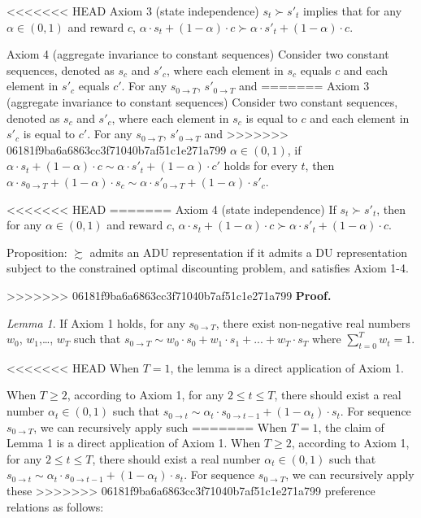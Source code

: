 \documentclass[
  12pt,
]{article}
\begin{document}
<<<<<<< HEAD
Axiom 3 (state independence) \(s_t \succ s'_t\) implies that for any
\(\alpha \in (0,1)\) and reward \(c\),
\(\alpha \cdot s_t + (1-\alpha)\cdot c \succ \alpha \cdot s'_t + (1-\alpha)\cdot c\).

Axiom 4 (aggregate invariance to constant sequences) Consider two
constant sequences, denoted as \(s_c\) and \(s'_c\), where each element
in \(s_c\) equals \(c\) and each element in \(s'_c\) equals \(c'\). For
any \(s_{0\rightarrow T}\), \(s'_{0\rightarrow T}\) and
=======
Axiom 3 (aggregate invariance to constant sequences) Consider two
constant sequences, denoted as \(s_c\) and \(s'_c\), where each element
in \(s_c\) is equal to \(c\) and each element in \(s'_c\) is equal to
\(c'\). For any \(s_{0\rightarrow T}\), \(s'_{0\rightarrow T}\) and
>>>>>>> 06181f9ba6a6863cc3f71040b7af51c1e271a799
\(\alpha\in(0,1)\), if
\(\alpha \cdot s_t+(1-\alpha)\cdot c\sim\alpha \cdot s'_t+(1-\alpha)\cdot c'\)
holds for every \(t\), then
\(\alpha \cdot s_{0\rightarrow T}+(1-\alpha)\cdot s_c\sim \alpha \cdot s'_{0\rightarrow T}+(1-\alpha)\cdot s'_c\).

<<<<<<< HEAD
=======
Axiom 4 (state independence) If \(s_t \succ s'_t\), then for any
\(\alpha \in (0,1)\) and reward \(c\),
\(\alpha \cdot s_t + (1-\alpha)\cdot c \succ \alpha \cdot s'_t + (1-\alpha)\cdot c\).

Proposition: \(\succsim\) admits an ADU representation if it admits a DU
representation subject to the constrained optimal discounting problem,
and satisfies Axiom 1-4.

>>>>>>> 06181f9ba6a6863cc3f71040b7af51c1e271a799
\textbf{Proof.}

\emph{Lemma 1}. If Axiom 1 holds, for any \(s_{0\rightarrow T}\), there
exist non-negative real numbers \(w_0\), \(w_1\),\ldots, \(w_T\) such
that
\(s_{0\rightarrow T} \sim w_0 \cdot s_0 +w_1\cdot s_1 + ...+w_T\cdot s_T\)
where \(\sum_{t=0}^T w_t=1\).

<<<<<<< HEAD
When \(T=1\), the lemma is a direct application of Axiom 1.

When \(T\geq 2\), according to Axiom 1, for any \(2\leq t\leq T\), there
should exist a real number \(\alpha_t\in(0,1)\) such that
\(s_{0\rightarrow t}\sim \alpha_t\cdot s_{0\rightarrow t-1}+(1-\alpha_t)\cdot s_{t}\).
For sequence \(s_{0\rightarrow T}\), we can recursively apply such
=======
When \(T=1\), the claim of Lemma 1 is a direct application of Axiom 1.
When \(T\geq 2\), according to Axiom 1, for any \(2\leq t\leq T\), there
should exist a real number \(\alpha_t\in(0,1)\) such that
\(s_{0\rightarrow t}\sim \alpha_t\cdot s_{0\rightarrow t-1}+(1-\alpha_t)\cdot s_{t}\).
For sequence \(s_{0\rightarrow T}\), we can recursively apply these
>>>>>>> 06181f9ba6a6863cc3f71040b7af51c1e271a799
preference relations as follows:
\end{document}
